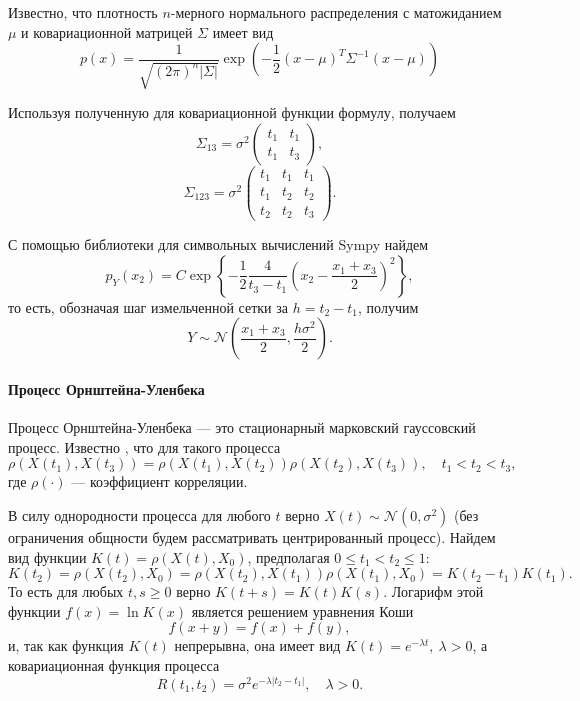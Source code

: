 \documentclass[16pt]{article}
\newcommand\A{(\cdot)}
\begin{document}
Известно, что плотность $n$-мерного нормального распределения с матожиданием $\mu$ и ковариационной матрицей $\Sigma$ имеет вид
\begin{equation}
p(x) = \dfrac{1}{\sqrt{(2\pi)^n|\Sigma|}}\exp\left(-\frac{1}{2} (x - \mu)^T\Sigma^{-1} (x - \mu)\right)
\end{equation}

Используя полученную для ковариационной функции формулу, получаем
$$
\Sigma_{13} = \sigma^2 \begin{pmatrix} 
t_1 & t_1 \\
t_1 & t_3
\end{pmatrix},
$$
$$
\Sigma_{123} = \sigma^2 \begin{pmatrix}
t_1 & t_1 & t_1 \\
t_1 & t_2 & t_2 \\
t_2 & t_2 & t_3
\end{pmatrix}.
$$

С помощью библиотеки для символьных вычислений Sympy найдем
$$p_Y(x_2) = C \exp\left\{ -\dfrac12\dfrac{4}{t_3 - t_1} \left(x_2 - \dfrac{x_1 + x_3}2\right)^2\right\},$$
то есть, обозначая шаг измельченной сетки за $h = t_2 - t_1$, получим $$Y \sim \mathcal{N}\left(\dfrac{x_1 + x_3}{2}, \dfrac{h\sigma^2}{2}\right).$$

\paragraph{Процесс Орнштейна-Уленбека}

Процесс Орнштейна-Уленбека --- это стационарный марковский гауссовский процесс.
Известно \cite{Feller}, что для такого процесса 
$$\rho(X(t_1), X(t_3)) = \rho(X(t_1), X(t_2))\rho(X(t_2), X(t_3)), \quad t_1 < t_2 < t_3,$$
где $\rho\A$ --- коэффициент корреляции.

В силу однородности процесса для любого $t$ верно $X(t) \sim \mathcal{N}(0, \sigma^2)$ (без ограничения общности будем рассматривать центрированный процесс).
Найдем вид функции $K(t) = \rho(X(t), X_0)$, предполагая $0 \leq t_1 < t_2 \leq 1$:
$$ K(t_2) = \rho(X(t_2), X_0) = \rho(X(t_2), X(t_1))\rho(X(t_1), X_0) = K(t_2 - t_1)K(t_1).$$
То есть для любых $t, s \geq 0$ верно $K(t + s) = K(t)K(s)$. Логарифм этой функции $f(x) = \ln K(x)$ является решением уравнения Коши
$$f(x + y) = f(x) + f(y),$$
и, так как функция $K(t)$ непрерывна, она имеет вид
$K(t) = e^{-\lambda t}, \ \lambda > 0$, а ковариационная функция процесса
$$R(t_1, t_2) = \sigma^2 e^{-\lambda |t_2 - t_1|}, \quad \lambda > 0.$$
\end{document}
